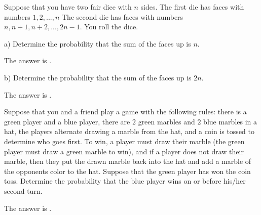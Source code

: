 \documentclass{ximera}
\begin{document}
Suppose that you have two fair dice with $n$ sides.  The first die has faces with numbers $1, 2, ..., n$  The second die has faces with numbers $n, n+1, n+2, ..., 2n-1$.  You roll the dice.

\begin{question}
a)  Determine the probability that the sum of the faces up is $n$.
     \begin{solution}
           The answer is .
     \end{solution}
\end{question}

\begin{question}
b)  Determine the probability that the sum of the faces up is $2n$.
     \begin{solution}
           The answer is .
     \end{solution}
\end{question}

\begin{question}
Suppose that you and a friend play a game with the following rules:  there is a green player and a blue player,  there are $2$ green marbles and $2$ blue marbles in a hat, the players alternate drawing a marble from the hat, and a coin is tossed to determine who goes first.  To win, a player must draw their marble (the green player must draw a green marble to win), and if a player does not draw their marble, then they put the drawn marble back into the hat and add a marble of the opponents color to the hat.  Suppose that the green player has won the coin toss.  Determine the probability that the blue player wins on or before his/her second turn.
     \begin{solution}
           The answer is .
     \end{solution}
\end{question}
\end{document}
